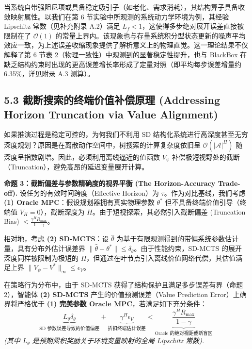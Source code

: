 \documentclass[UTF8]{ctexart}
\begin{document}
当系统自带强阻尼项或具备稳定吸引子（如老化、需求消耗），其结构算子具备收敛映射属性。以我们在第
6 节实验中所观测的系统动力学环境为例，其经验 Lipschitz 常数（见补充附录 A.2）满足
\(L_f < 1\)，这使得多步绝对展开误差直接被限制在了 \(\mathcal{O}(1)\)
的常量上界内。该现象也与存量系统积分型状态更新的噪声平均效应一致，为上述误差收缩现象提供了解析意义上的物理直觉。这一理论结果不仅解释了第 6 节表 2（物理一致性）中观测到的显著稳定性提升，也与 BlackBox 在缺乏结构约束时出现的更高误差增长率形成了定量对照（即平均每步误差增量约 6.35\%，详见附录 A.3 测算）。

\hypertarget{ux957fux89c6ux91ceux622aux65adux8865ux507fux539fux7406-addressing-horizon-truncation-via-value-alignment}{%
\subsection{5.3 截断搜索的终端价值补偿原理 (Addressing Horizon Truncation via Value Alignment)}\label{ux957fux89c6ux91ceux622aux65adux8865ux507fux539fux7406-addressing-horizon-truncation-via-value-alignment}}

如果推演过程是稳定可控的，为何我们不利用 SD 结构化系统进行高深度甚至无穷深度规划？原因是在离散动作空间中，树搜索的计算复杂度依旧呈 \(\mathcal{O}(|\mathcal{A}|^H)\) 随深度呈指数剧增。因此，必须利用离线逼近的值函数 \(V_\psi\) 补偿极短视野处的截断（Truncation），避免高昂的延迟变量展开计算。

\textbf{命题 3：截断偏差与参数精确度的视界平衡 (The Horizon-Accuracy Trade-off). }
设任务的有效时间跨度（Effective Horizon）为 \(\tau\)。作为对比基线，我们考虑 \textbf{(1) Oracle MPC}：假设规划器拥有真实物理参数 \(\theta^*\) 但不具备终端价值引导（终端值 \(V_H=0\)），截断深度为 \(H\)。由于短视探索，其必然引入截断偏差 (Truncation Bias) \(\le \frac{\gamma^H R_{\max}}{1-\gamma}\)。

相对地，考虑 \textbf{(2) SD-MCTS}：设 \(\hat{\theta}\) 为基于有限观测得到的带偏系统参数估计量，具有分布外估计误差界 \(\|\hat{\theta} - \theta^*\| \leq \delta_\theta\)。由于性能约束，SD-MCTS 的展开深度同样被限制为极短的 \(H\)，但通过在叶节点引入离线价值网络代偿，其估值满足上界 \(\|V_\psi - V^*\|_\infty \leq \epsilon_V\)。

在策略行为分布中，由于 SD-MCTS 获得了结构保护且满足多步误差有界（命题 2），智能体 \textbf{(2) SD-MCTS} 产生的价值预测误差（Value Prediction Error）上确界将严格优于 \textbf{(1) 完美参数 Oracle MPC}，若满足如下充分条件：
\[
\underbrace{L_\theta \delta_\theta}_{\text{SD 参数误差导致的价值偏差}} + \underbrace{\gamma^H \epsilon_V}_{\text{折扣终端估计误差}} < \underbrace{\frac{\gamma^H R_{\max}}{1-\gamma}}_{\text{Oracle 的绝对视距截断盲区}}
\]
\emph{(其中 \(L_\theta\) 是预期累积奖励关于环境变量映射的全局 Lipschitz 常数).}
\end{document}
